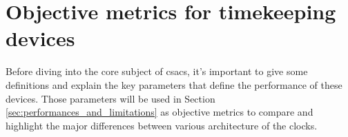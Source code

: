 \section{Objective metrics for timekeeping devices}
\label{sec:objective_metrics}

Before diving into the core subject of \acrshort{csacs}, it's important to give some definitions and explain the key parameters that define the performance of these devices.
Those parameters will be used in Section \ref{sec:performances_and_limitations} as objective metrics to compare and highlight the major differences between various architecture of the clocks.




